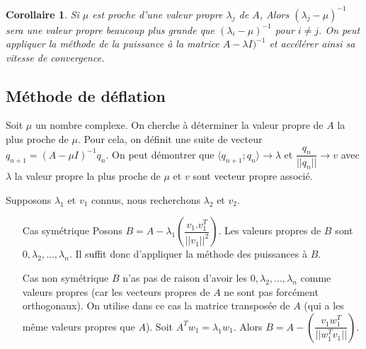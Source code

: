 \documentclass{article}
\newtheorem{coro}{Corollaire}
\newcommand{\scalar}[2]{\langle #1 ; #2 \rangle}
\begin{document}
\begin{coro}
Si $\mu$ est proche d'une valeur propre $\lambda_j$ de $A$, Alors $(\lambda_j - \mu)^{-1}$ sera une valeur propre beaucoup plus grande que $(\lambda_i - \mu)^{-1}$ pour $i\neq j$. On peut appliquer la méthode de la puissance à la matrice $A-\lambda I)^{-1}$ et accélérer ainsi sa vitesse de convergence.
\end{coro}


\subsection*{Méthode de déflation}
Soit $\mu$ un nombre complexe. On cherche à déterminer la valeur propre de $A$ la plus proche de $\mu$. Pour cela, on définit une suite de vecteur $q_{n+1} = (A-\mu I)^{-1}q_n$. On peut démontrer que $\scalar{q_{n+1}}{q_n} \to \lambda$ et $\dfrac{q_n}{||q_n||}\to v$ avec $\lambda$ la valeur propre la plus proche de $\mu$ et $v$ sont vecteur propre associé.


Supposons $\lambda_1$ et $v_1$ connus, nous recherchons $\lambda_2$ et $v_2$.
\begin{itemize}
\item[Cas symétrique] Posons $B=A-\lambda_1 \left( \dfrac{v_1.v_1^T}{||v_1||^2}\right)$. Les valeurs propres de $B$ sont $0,\lambda_2,...,\lambda_n$. Il suffit donc d'appliquer la méthode des puissances à $B$.
\item[Cas non symétrique] $B$ n'as pas de raison d'avoir les $0,\lambda_2,...,\lambda_n$ comme valeurs propres (car les vecteurs propres de $A$ ne sont pas forcément orthogonaux). On utilise dans ce cas la matrice transposée de $A$ (qui a les même valeurs propres que $A$). Soit $A^Tw_1=\lambda_1w_1$. Alors $B=A-\left(
\dfrac{v_1w_1^T}{||w_1^Tv_1||} \right)$.
\end{itemize}
\end{document}
